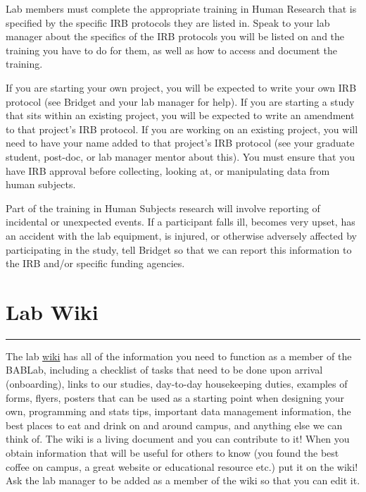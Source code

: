\documentclass[
]{book}
\begin{document}
Lab members must complete the appropriate training in Human Research that is specified by the specific IRB protocols they are listed in. Speak to your lab manager about the specifics of the IRB protocols you will be listed on and the training you have to do for them, as well as how to access and document the training.

If you are starting your own project, you will be expected to write your own IRB protocol (see Bridget and your lab manager for help). If you are starting a study that sits within an existing project, you will be expected to write an amendment to that project's IRB protocol. If you are working on an existing project, you will need to have your name added to that project's IRB protocol (see your graduate student, post-doc, or lab manager mentor about this). You must ensure that you have IRB approval before collecting, looking at, or manipulating data from human subjects.

Part of the training in Human Subjects research will involve reporting of incidental or unexpected events. If a participant falls ill, becomes very upset, has an accident with the lab equipment, is injured, or otherwise adversely affected by participating in the study, tell Bridget so that we can report this information to the IRB and/or specific funding agencies.

\hypertarget{lab-wiki}{%
\chapter{Lab Wiki}\label{lab-wiki}}

\begin{center}\rule{0.5\linewidth}{0.5pt}\end{center}

The lab \href{https://bablab.github.io/wiki_bablab/}{wiki} has all of the information you need to function as a member of the BABLab, including a checklist of tasks that need to be done upon arrival (onboarding), links to our studies, day-to-day housekeeping duties, examples of forms, flyers, posters that can be used as a starting point when designing your own, programming and stats tips, important data management information, the best places to eat and drink on and around campus, and anything else we can think of. The wiki is a living document and you can contribute to it! When you obtain information that will be useful for others to know (you found the best coffee on campus, a great website or educational resource etc.) put it on the wiki! Ask the lab manager to be added as a member of the wiki so that you can edit it.
\end{document}
